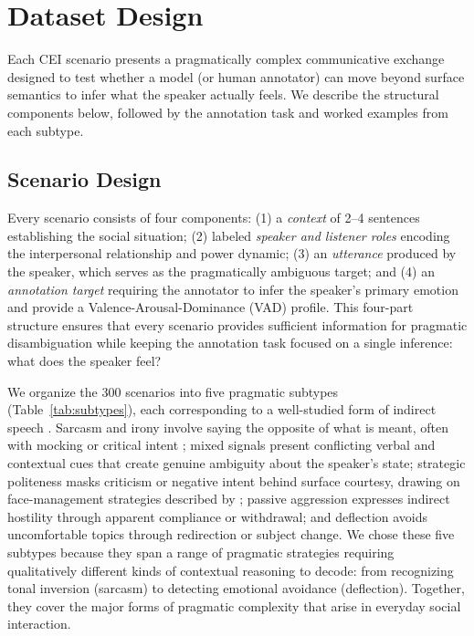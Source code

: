 \documentclass[twoside,11pt]{article}
\begin{document}
\section{Dataset Design}
\label{sec:design}

Each CEI scenario presents a pragmatically complex communicative exchange designed to test whether a model (or human annotator) can move beyond surface semantics to infer what the speaker actually feels. We describe the structural components below, followed by the annotation task and worked examples from each subtype.

\subsection{Scenario Design}

Every scenario consists of four components: (1) a \textit{context} of 2--4 sentences establishing the social situation; (2) labeled \textit{speaker and listener roles} encoding the interpersonal relationship and power dynamic; (3) an \textit{utterance} produced by the speaker, which serves as the pragmatically ambiguous target; and (4) an \textit{annotation target} requiring the annotator to infer the speaker's primary emotion and provide a Valence-Arousal-Dominance (VAD) profile. This four-part structure ensures that every scenario provides sufficient information for pragmatic disambiguation while keeping the annotation task focused on a single inference: what does the speaker feel?

We organize the 300 scenarios into five pragmatic subtypes (Table~\ref{tab:subtypes}), each corresponding to a well-studied form of indirect speech \citep{levinson1983pragmatics}. Sarcasm and irony involve saying the opposite of what is meant, often with mocking or critical intent \citep{joshi2017automatic}; mixed signals present conflicting verbal and contextual cues that create genuine ambiguity about the speaker's state; strategic politeness masks criticism or negative intent behind surface courtesy, drawing on face-management strategies described by \citet{brown1987politeness}; passive aggression expresses indirect hostility through apparent compliance or withdrawal; and deflection avoids uncomfortable topics through redirection or subject change. We chose these five subtypes because they span a range of pragmatic strategies requiring qualitatively different kinds of contextual reasoning to decode: from recognizing tonal inversion (sarcasm) to detecting emotional avoidance (deflection). Together, they cover the major forms of pragmatic complexity that arise in everyday social interaction.
\end{document}
